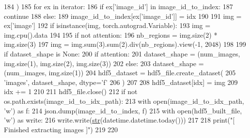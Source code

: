 \begin{DoxyCode}
184         )
185         \textcolor{keywordflow}{for} ex \textcolor{keywordflow}{in} iterator:
186             \textcolor{keywordflow}{if} ex[\textcolor{stringliteral}{'image\_id'}] \textcolor{keywordflow}{in} image\_id\_to\_index:
187                 \textcolor{keywordflow}{continue}
188             \textcolor{keywordflow}{else}:
189                 image\_id\_to\_index[ex[\textcolor{stringliteral}{'image\_id'}]] = idx
190 
191             img = ex[\textcolor{stringliteral}{'image'}]
192             \textcolor{keywordflow}{if} isinstance(img, torch.autograd.Variable):
193                 img = img.cpu().data
194 
195             \textcolor{keywordflow}{if} \textcolor{keywordflow}{not} attention:
196                 nb\_regions = img.size(2) * img.size(3)
197                 img = img.sum(3).sum(2).div(nb\_regions).view(-1, 2048)
198 
199             \textcolor{keywordflow}{if} dataset\_shape \textcolor{keywordflow}{is} \textcolor{keywordtype}{None}:
200                 \textcolor{keywordflow}{if} attention:
201                     dataset\_shape = (num\_images, img.size(1), img.size(2), img.size(3))
202                 \textcolor{keywordflow}{else}:
203                     dataset\_shape = (num\_images, img.size(1))
204                 hdf5\_dataset = hdf5\_file.create\_dataset(
205                     \textcolor{stringliteral}{'images'}, dataset\_shape, dtype=\textcolor{stringliteral}{'f'}
206                 )
207 
208             hdf5\_dataset[idx] = img
209             idx += 1
210 
211         hdf5\_file.close()
212         \textcolor{keywordflow}{if} \textcolor{keywordflow}{not} os.path.exists(image\_id\_to\_idx\_path):
213             with open(image\_id\_to\_idx\_path, \textcolor{stringliteral}{'w'}) \textcolor{keyword}{as} f:
214                 json.dump(image\_id\_to\_index, f)
215         with open(hdf5\_built\_file, \textcolor{stringliteral}{'w'}) \textcolor{keyword}{as} write:
216             write.write(\hyperlink{namespacegenerate__task__READMEs_a5b88452ffb87b78c8c85ececebafc09f}{str}(datetime.datetime.today()))
217 
218     print(\textcolor{stringliteral}{"[ Finished extracting images ]"})
219 
220 
\end{DoxyCode}
\mbox{\label{namespaceparlai_1_1scripts_1_1extract__image__feature_a4fa5d8aef45056034f4898531a0f9967}} 
